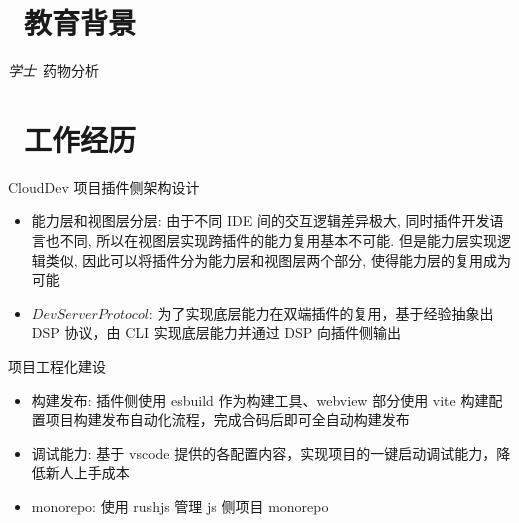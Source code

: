 \documentclass{resume}
\begin{document}



\section{\faGraduationCap\  教育背景}
\textit{学士}\ 药物分析

\section{\faUsers\ 工作经历}


\begin{onehalfspacing}
CloudDev 项目插件侧架构设计
\begin{itemize}
  \item 能力层和视图层分层: 由于不同 IDE 间的交互逻辑差异极大, 同时插件开发语言也不同, 所以在视图层实现跨插件的能力复用基本不可能. 但是能力层实现逻辑类似, 因此可以将插件分为能力层和视图层两个部分, 使得能力层的复用成为可能
  \item \(Dev Server Protocol\): 为了实现底层能力在双端插件的复用，基于经验抽象出 DSP 协议，由 CLI 实现底层能力并通过 DSP 向插件侧输出
\end{itemize}
\end{onehalfspacing}

\begin{onehalfspacing}
项目工程化建设
\begin{itemize}
  \item 构建发布: 插件侧使用 esbuild 作为构建工具、webview 部分使用 vite 构建配置项目构建发布自动化流程，完成合码后即可全自动构建发布
  \item 调试能力: 基于 vscode 提供的各配置内容，实现项目的一键启动调试能力，降低新人上手成本
  \item monorepo: 使用 rushjs 管理 js 侧项目 monorepo
\end{itemize}
\end{onehalfspacing}
\end{document}
